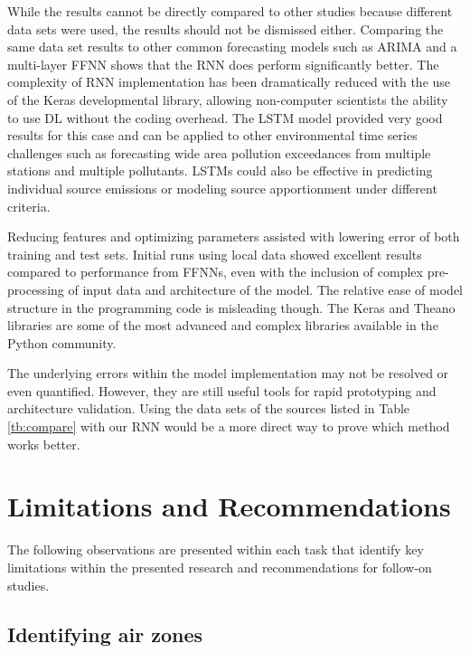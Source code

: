 While the results cannot be directly compared to other studies because different data sets were used, the results should not be dismissed either. Comparing the same data set results to other common forecasting models such as ARIMA and a multi-layer FFNN shows that the RNN does perform significantly better. The complexity of RNN implementation has been dramatically reduced with the use of the Keras developmental library, allowing non-computer scientists the ability to use DL without the coding overhead. The LSTM model provided very good results for this case and can be applied to other environmental time series challenges such as forecasting wide area pollution exceedances from multiple stations and multiple pollutants. LSTMs could also be effective in predicting individual source emissions or modeling source apportionment under different criteria. 

Reducing features and optimizing parameters assisted with lowering error of both training and test sets. Initial runs using local data showed excellent results compared to performance from FFNNs, even with the inclusion of complex pre-processing of input data and architecture of the model. The relative ease of model structure in the programming code is misleading though. The Keras and Theano libraries are some of the most advanced and complex libraries available in the Python community. 

The underlying errors within the model implementation may not be resolved or even quantified. However, they are still useful tools for rapid prototyping and architecture validation. Using the data sets of the sources listed in Table \ref{tb:compare} with our RNN would be a more direct way to prove which method works better.

\section{Limitations and Recommendations}

The following observations are presented within each task that identify key limitations within the presented research and recommendations for follow-on studies.

\noindent
\subsection*{Identifying air zones}

